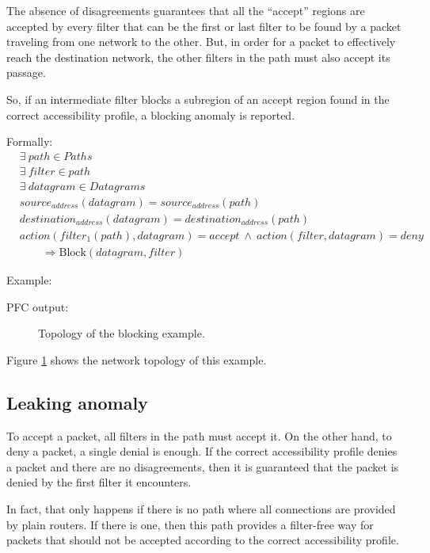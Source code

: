 The absence of disagreements guarantees that all the ``accept'' regions are accepted by
every filter that can be the first or last filter to be found by a packet traveling from
one network to the other. But, in order for a packet to effectively reach the
destination network, the other filters in the path must also accept its passage.

So, if an intermediate filter blocks a subregion of an accept region found in
the correct accessibility profile, a blocking anomaly is reported.

Formally:
\begin{align*}
	& \exists ~ path \in Paths \\
	& \exists ~ filter \in path \\
	& \exists ~ datagram \in Datagrams \\
	& source_{address}(datagram) = source_{address}(path) \\
	& destination_{address}(datagram) = destination_{address}(path) \\
	& action(filter_1(path), datagram) = accept ~ \wedge ~ action(filter, datagram) = deny \\
	& \qquad \Rightarrow \mbox{Block}(datagram, filter)
\end{align*}

Example:



PFC output:



\begin{figure}
	\caption{\label{fig:exblock:topo}Topology of the blocking example.}
\end{figure}

Figure \ref{fig:exblock:topo} shows the network topology of this example.




\subsection{Leaking anomaly}

To accept a packet, all filters in the path must accept it. On the other hand,
to deny a packet, a single denial is enough. If the correct accessibility
profile denies a packet and there are no disagreements, then it is guaranteed
that the packet is denied by the first filter it encounters.

In fact, that only happens if there is no path where all connections are
provided by plain routers. If there is one, then this path provides a
filter-free way for packets that should not be accepted according to the correct
accessibility profile.

